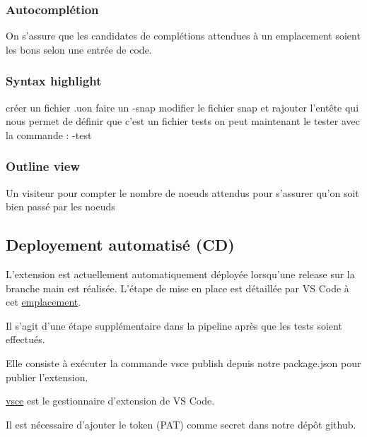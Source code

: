 \documentclass[
    iict, %
    il, %
]{heig-tb}
\begin{document}
\subsubsection{Autocomplétion}
On s'assure que les candidates de complétions attendues à un emplacement soient les bons selon une entrée de code.

\subsubsection{Syntax highlight}
créer un fichier .uon
faire un -snap
modifier le fichier snap et rajouter l'entête qui nous permet de définir que c'est un fichier tests
on peut maintenant le tester avec la commande : -test



\subsubsection{Outline view}
Un visiteur pour compter le nombre de noeuds attendus pour s'assurer qu'on soit bien passé par les noeuds




\subsection{Deployement automatisé (CD)}

L'extension est actuellement automatiquement déployée lorsqu'une release sur la branche main est réalisée.
L'étape de mise en place est détaillée par VS Code à cet \href{https://code.visualstudio.com/api/working-with-extensions/continuous-integration#github-actions}{emplacement}.

Il s'agit d'une étape supplémentaire dans la pipeline après que les tests soient effectués.

Elle consiste à exécuter la commande vsce publish depuis notre package.json pour publier l'extension.

\href{https://www.npmjs.com/package/vsce}{vsce} est le gestionnaire d'extension de VS Code.

Il est nécessaire d'ajouter le token (PAT) comme secret dans notre dépôt github. %
\end{document}
